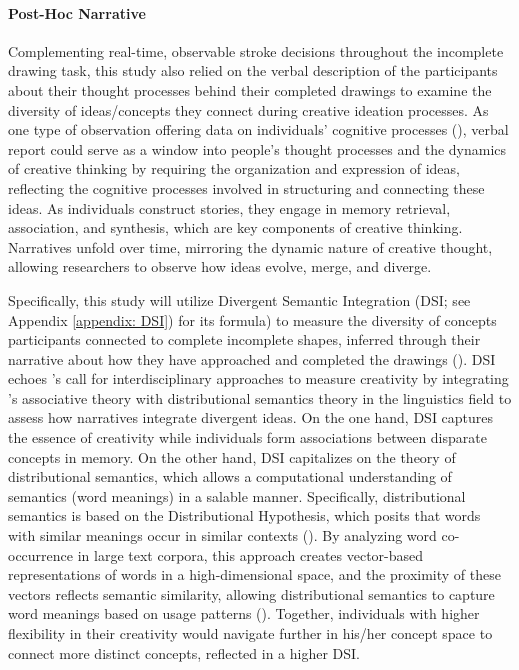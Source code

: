 \documentclass[../MA_Thesis.tex]{subfiles}
\begin{document}
\paragraph*{Post-Hoc Narrative}
Complementing real-time, observable stroke decisions throughout the incomplete drawing task, this study also relied on the verbal description of the participants about their thought processes behind their completed drawings to examine the diversity of ideas/concepts they connect during creative ideation processes. As one type of observation offering data on individuals' cognitive processes (\cite{ericsson_verbal_2003}), verbal report could serve as a window into people's thought processes and the dynamics of creative thinking by requiring the organization and expression of ideas, reflecting the cognitive processes involved in structuring and connecting these ideas. As individuals construct stories, they engage in memory retrieval, association, and synthesis, which are key components of creative thinking. Narratives unfold over time, mirroring the dynamic nature of creative thought, allowing researchers to observe how ideas evolve, merge, and diverge.

Specifically, this study will utilize Divergent Semantic Integration (DSI; see Appendix \ref{appendix: DSI}) for its formula) to measure the diversity of concepts participants connected to complete incomplete shapes, inferred through their narrative about how they have approached and completed the drawings (\cite{johnson_divergent_2022}). DSI echoes \textcite{kaufman_cambridge_2010}'s call for interdisciplinary approaches to measure creativity by integrating \textcite{mednick_associative_1962}'s associative theory with distributional semantics theory in the linguistics field to assess how narratives integrate divergent ideas. On the one hand, DSI captures the essence of creativity while individuals form associations between disparate concepts in memory. On the other hand, DSI capitalizes on the theory of distributional semantics, which allows a computational understanding of semantics (word meanings) in a salable manner. Specifically, distributional semantics is based on the Distributional Hypothesis, which posits that words with similar meanings occur in similar contexts (\cite{lenci_distributional_2008}). By analyzing word co-occurrence in large text corpora, this approach creates vector-based representations of words in a high-dimensional space, and the proximity of these vectors reflects semantic similarity, allowing distributional semantics to capture word meanings based on usage patterns (\cite{boleda_distributional_2020}). Together, individuals with higher flexibility in their creativity would navigate further in his/her concept space to connect more distinct concepts, reflected in a higher DSI.
\end{document}
